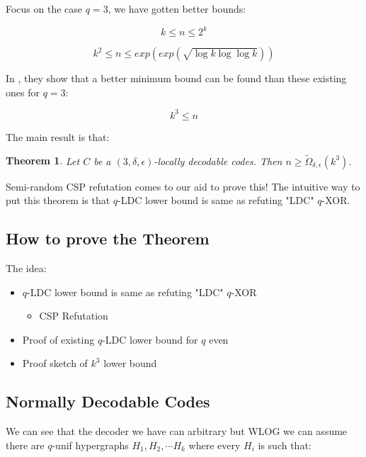 \documentclass{article}
\newtheorem{theorem}{Theorem}
\begin{document}
\noindent Focus on the case $q=3$, we have gotten better bounds:

\begin{equation}
k \leq n \leq 2^k
\end{equation}

\begin{equation*}
k^2 \leq n \leq exp(exp(\sqrt{\log k \log \log k}))
\end{equation*}

\noindent In \cite{Alrabiah2022-ds}, they show that a better minimum bound can be found than these existing ones for $q=3$:

\begin{equation}
k^3 \leq n
\end{equation}

\noindent The main result is that:

\begin{theorem}
Let $C$ be a $(3, \delta, \epsilon)$-locally decodable codes. Then $n \geq \tilde{\Omega}_{\delta, \epsilon}(k^3)$.
\end{theorem}

\noindent Semi-random CSP refutation comes to our aid to prove this! The intuitive way to put this theorem is that $q$-LDC lower bound is same as refuting "LDC" $q$-XOR.

\subsection{How to prove the Theorem}

The idea:

\begin{itemize}
    \item $q$-LDC lower bound is same as refuting "LDC" $q$-XOR \label{proofp1}
        \begin{itemize}
            \item CSP Refutation
        \end{itemize}
    \item Proof of existing $q$-LDC lower bound for $q$ even
    \item Proof sketch of $k^3$ lower bound
\end{itemize}

\subsection{Normally Decodable Codes}

We can see that the decoder we have can arbitrary but WLOG we can assume there are $q$-unif hypergraphs ${H_1, H_2, \cdots H_k}$ where every $H_i$ is such that:
\end{document}
